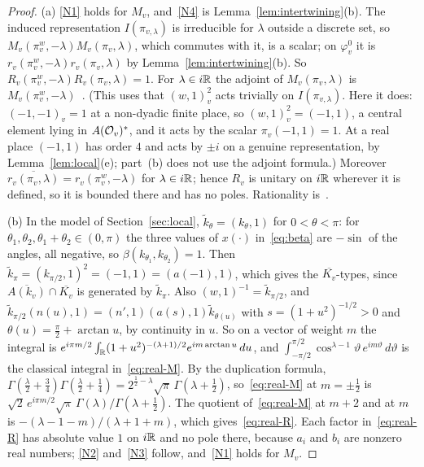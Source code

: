 \begin{proof}
(a) \ref{N1} holds for $M_v$, and~\ref{N4} is
Lemma~\ref{lem:intertwining}(b). The induced representation
$I(\pi_{v,\lambda})$ is irreducible for $\lambda$ outside a discrete
set, so $M_v(\pi_v^w,-\lambda)M_v(\pi_v,\lambda)$, which commutes with
it, is a scalar; on $\varphi_v^0$ it is $r_v(\pi_v^w,-\lambda)
r_v(\pi_v,\lambda)$ by Lemma~\ref{lem:intertwining}(b). So
$R_v(\pi^w_v,-\lambda)R_v(\pi_v,\lambda)=1$. For $\lambda\in i\mathbb{R}$ the
adjoint of $M_v(\pi_v,\lambda)$ is $M_v(\pi_v^w,-\lambda)$~\cite[\S1]{Ar89}. (This
uses that $(w,1)_v^2$ acts trivially on $I(\pi_{v,\lambda})$. Here it
does: $(-1,-1)_v=1$ at a non-dyadic finite place, so $(w,1)_v^2=(-1,1)$,
a central element lying in $A(\mathcal{O}_v)^*$, and it acts by the scalar
$\pi_v(-1,1)=1$. At a real place $(-1,1)$ has order $4$ and acts by $\pm
i$ on a genuine representation, by Lemma~\ref{lem:local}(e); part~(b)
does not use the adjoint formula.) Moreover
$\overline{r_v(\pi_v,\lambda)}=r_v(\pi_v^w,-\lambda)$ for $\lambda\in i\mathbb{R}$;
hence $R_v$ is unitary on $i\mathbb{R}$ wherever it is defined, so it is bounded
there and has no poles. Rationality is~\cite{Li12a}.

(b) In the model of Section~\ref{sec:local}, $\tilde k_\theta=(k_\theta,1)$
for $0<\theta<\pi$: for $\theta_1,\theta_2,\theta_1+\theta_2\in(0,\pi)$
the three values of $x(\cdot)$ in~\eqref{eq:beta} are $-\sin$ of the
angles, all negative, so $\beta(k_{\theta_1},k_{\theta_2})=1$. Then
$\tilde k_\pi=(k_{\pi/2},1)^2=(-1,1)=(a(-1),1)$, which gives the
$\overline{K_v}$-types, since $\overline{A(k_v)}\cap\overline{K_v}$ is
generated by $\tilde k_\pi$. Also $(w,1)^{-1}=\tilde k_{\pi/2}$, and
$\tilde k_{\pi/2}(n(u),1)=(n',1)(a(s),1)\tilde k_{\theta(u)}$ with
$s=(1+u^2)^{-1/2}>0$ and $\theta(u)=\frac\pi2+\arctan u$, by
continuity in $u$. So on a vector of weight $m$ the
integral is $e^{i\pi m/2}\int_{\mathbb{R}}(1+u^2)^{-(\lambda+1)/2}e^{im\arctan u}\,du$,
and $\int_{-\pi/2}^{\pi/2}\cos^{\lambda-1}\vartheta\,e^{im\vartheta}\,
d\vartheta$ is the classical integral in~\eqref{eq:real-M}. By the
duplication formula, $\Gamma(\frac{\lambda}2+\frac34)\Gamma(\frac\lambda2+
\frac14)=2^{\frac12-\lambda}\sqrt\pi\,\Gamma(\lambda+\frac12)$,
so~\eqref{eq:real-M} at $m=\pm\frac12$ is $\sqrt2\,e^{i\pi m/2}\sqrt\pi\,
\Gamma(\lambda)/\Gamma(\lambda+\frac12)$. The quotient of~\eqref{eq:real-M}
at $m+2$ and at $m$ is $-(\lambda-1-m)/(\lambda+1+m)$,
which gives~\eqref{eq:real-R}. Each factor in~\eqref{eq:real-R} has
absolute value $1$ on $i\mathbb{R}$ and no pole there, because $a_i$ and $b_i$
are nonzero real numbers; \ref{N2} and~\ref{N3} follow, and~\ref{N1}
holds for $M_v$.


\end{proof}
